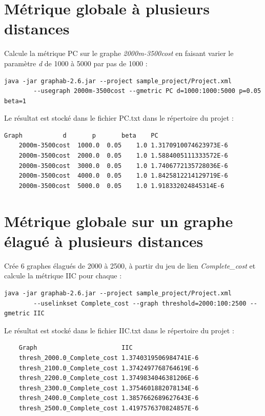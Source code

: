 \documentclass[a4paper,10pt]{report}
\begin{document}
\section{Métrique globale à plusieurs distances}
Calcule la métrique PC sur le graphe \textit{2000m-3500cost} en faisant varier le paramètre \textit{d} de 1000 à 5000 par pas de 1000 :
\begin{Verbatim}[tabsize=4]
	java -jar graphab-2.6.jar --project sample_project/Project.xml
		--usegraph 2000m-3500cost --gmetric PC d=1000:1000:5000 p=0.05 beta=1
\end{Verbatim}
Le résultat est stocké dans le fichier PC.txt dans le répertoire du projet :
\begin{Verbatim}[tabsize=4]
	Graph         	d     	p   	beta	PC
	2000m-3500cost	1000.0	0.05	1.0	1.3170910074623973E-6
	2000m-3500cost	2000.0	0.05	1.0	1.5884005111333572E-6
	2000m-3500cost	3000.0	0.05	1.0	1.7406772135728036E-6
	2000m-3500cost	4000.0	0.05	1.0	1.8425812214129719E-6
	2000m-3500cost	5000.0	0.05	1.0	1.918332024845314E-6
\end{Verbatim}

\section{Métrique globale sur un graphe élagué à plusieurs distances}
Crée 6 graphes élagués de 2000 à 2500, à partir du jeu de lien \textit{Complete\_cost} et calcule la métrique IIC pour chaque :
\begin{Verbatim}[tabsize=4]
	java -jar graphab-2.6.jar --project sample_project/Project.xml
		--uselinkset Complete_cost --graph threshold=2000:100:2500 --gmetric IIC
\end{Verbatim}
Le résultat est stocké dans le fichier IIC.txt dans le répertoire du projet :
\begin{Verbatim}
	Graph                      	IIC
	thresh_2000.0_Complete_cost	1.3740319506984741E-6
	thresh_2100.0_Complete_cost	1.3742497768764619E-6
	thresh_2200.0_Complete_cost	1.3749834046381206E-6
	thresh_2300.0_Complete_cost	1.3754601882078134E-6
	thresh_2400.0_Complete_cost	1.3857662689627643E-6
	thresh_2500.0_Complete_cost	1.4197576370824857E-6
\end{Verbatim}
\end{document}
